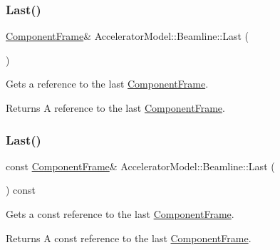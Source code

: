 \subsubsection{\texorpdfstring{Last()}{Last()}\hspace{0.1cm}{\footnotesize\ttfamily [1/2]}}
{\footnotesize\ttfamily \hyperlink{classComponentFrame}{Component\+Frame}\& Accelerator\+Model\+::\+Beamline\+::\+Last (\begin{DoxyParamCaption}{ }\end{DoxyParamCaption})\hspace{0.3cm}{\ttfamily [inline]}}

Gets a reference to the last \hyperlink{classComponentFrame}{Component\+Frame}. \begin{DoxyReturn}{Returns}
A reference to the last \hyperlink{classComponentFrame}{Component\+Frame}. 
\end{DoxyReturn}
\mbox{\label{classAcceleratorModel_1_1Beamline_a3d9e8887cc1b7cfbc0d497f749af3950}} 
\subsubsection{\texorpdfstring{Last()}{Last()}\hspace{0.1cm}{\footnotesize\ttfamily [2/2]}}
{\footnotesize\ttfamily const \hyperlink{classComponentFrame}{Component\+Frame}\& Accelerator\+Model\+::\+Beamline\+::\+Last (\begin{DoxyParamCaption}{ }\end{DoxyParamCaption}) const\hspace{0.3cm}{\ttfamily [inline]}}

Gets a const reference to the last \hyperlink{classComponentFrame}{Component\+Frame}. \begin{DoxyReturn}{Returns}
A const reference to the last \hyperlink{classComponentFrame}{Component\+Frame}. 
\end{DoxyReturn}
\mbox{\label{classAcceleratorModel_1_1Beamline_a5e20d3e994c496cf16744d0a54bd26a0}} 
